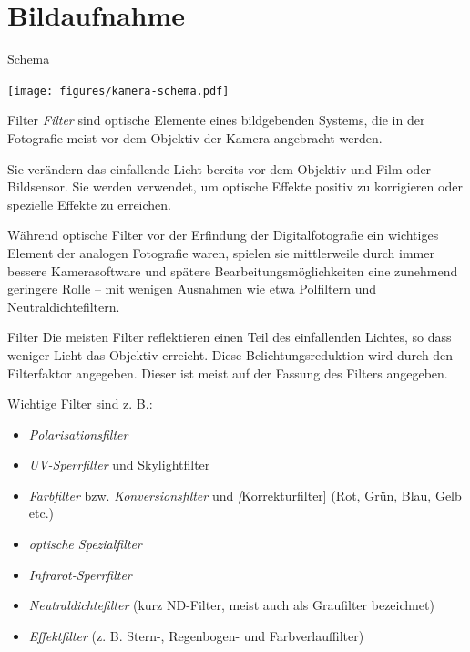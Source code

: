 \section{Bildaufnahme}

\begin{defi}[Kamera]{Schema}

    \centering
    \texttt{[image: figures/kamera-schema.pdf]}
\end{defi}

\begin{defi}[Kamera]{Filter}
    \emph{Filter} sind optische Elemente eines bildgebenden Systems, die in der Fotografie meist vor dem Objektiv der Kamera angebracht werden.

    Sie verändern das einfallende Licht bereits vor dem Objektiv und Film oder Bildsensor.
    Sie werden verwendet, um optische Effekte positiv zu korrigieren oder spezielle Effekte zu erreichen.

    Während optische Filter vor der Erfindung der Digitalfotografie ein wichtiges Element der analogen Fotografie waren, spielen sie mittlerweile durch immer bessere Kamerasoftware und spätere Bearbeitungsmöglichkeiten eine zunehmend geringere Rolle -- mit wenigen Ausnahmen wie etwa Polfiltern und Neutraldichtefiltern.
\end{defi}

\begin{example}[Kamera]{Filter}
    Die meisten Filter reflektieren einen Teil des einfallenden Lichtes, so dass weniger Licht das Objektiv erreicht.
    Diese Belichtungsreduktion wird durch den Filterfaktor angegeben.
    Dieser ist meist auf der Fassung des Filters angegeben.

    Wichtige Filter sind z. B.:
    \begin{itemize}
        \item \emph{Polarisationsfilter}
        \item \emph{UV-Sperrfilter} und Skylightfilter
        \item \emph{Farbfilter} bzw. \emph{Konversionsfilter} und \emph[Korrekturfilter] (Rot, Grün, Blau, Gelb etc.)
        \item \emph{optische Spezialfilter}
        \item \emph{Infrarot-Sperrfilter}
        \item \emph{Neutraldichtefilter} (kurz ND-Filter, meist auch als Graufilter bezeichnet)
        \item \emph{Effektfilter} (z. B. Stern-, Regenbogen- und Farbverlauffilter)
    \end{itemize}
\end{example}

